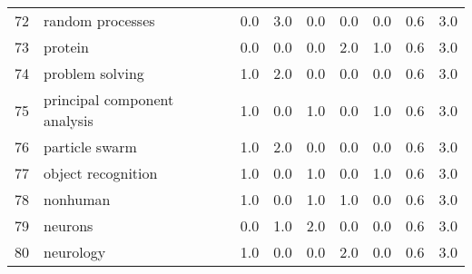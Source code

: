 \begin{tabular}{llrrrrrrr}
72 &                         random processes &   0.0 &   3.0 &   0.0 &   0.0 &   0.0 &   0.6 &    3.0 \\
73 &                                  protein &   0.0 &   0.0 &   0.0 &   2.0 &   1.0 &   0.6 &    3.0 \\
74 &                          problem solving &   1.0 &   2.0 &   0.0 &   0.0 &   0.0 &   0.6 &    3.0 \\
75 &             principal component analysis &   1.0 &   0.0 &   1.0 &   0.0 &   1.0 &   0.6 &    3.0 \\
76 &                           particle swarm &   1.0 &   2.0 &   0.0 &   0.0 &   0.0 &   0.6 &    3.0 \\
77 &                       object recognition &   1.0 &   0.0 &   1.0 &   0.0 &   1.0 &   0.6 &    3.0 \\
78 &                                 nonhuman &   1.0 &   0.0 &   1.0 &   1.0 &   0.0 &   0.6 &    3.0 \\
79 &                                  neurons &   0.0 &   1.0 &   2.0 &   0.0 &   0.0 &   0.6 &    3.0 \\
80 &                                neurology &   1.0 &   0.0 &   0.0 &   2.0 &   0.0 &   0.6 &    3.0 \\
\bottomrule
\end{tabular}
